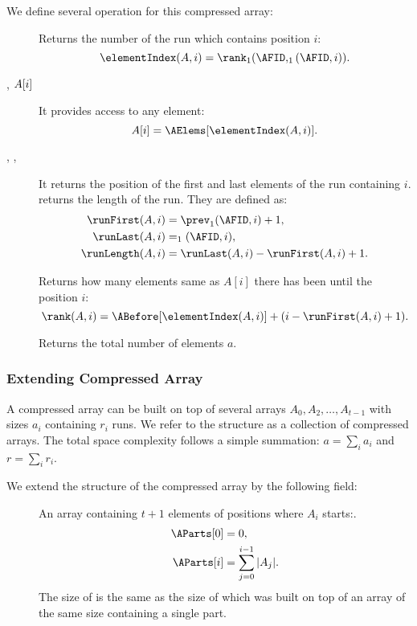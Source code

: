 We define several operation for this compressed array:
\begin{description}
	\item[\elementIndex{}]
	Returns the number of the run which contains position $i$:
	$$ \elementIndex(A, i) = \rank_1(\AFID, \succ_1(\AFID, i)). $$

	\item[\inspect{}, $A[i\char93$]
	It provides access to any element:
	$$ A[i] = \AElems[\elementIndex(A, i)]. $$

	\item[\runFirst{}, \runLast{}, \runLength{}]
	It returns the position of the first and last elements of the run containing $i$.
	\runLength{} returns the length of the run.
	They are defined as:
	\begin{align*}
		\runFirst(A, i) &= \prev_1(\AFID, i) + 1, \\
		\runLast(A, i) &= \succ_1(\AFID, i), \\
		\runLength(A, i) &= \runLast(A, i) - \runFirst(A, i) + 1.
	\end{align*}
	
	\item[\rank{}]
	Returns how many elements same as $A[i]$ there has been until the position $i$:
	$$ \rank(A, i) = \ABefore[\elementIndex(A, i)] + (i - \runFirst(A, i) + 1). $$
	
	\item[\size{}]
	Returns the total number of elements $a$.
\end{description}

\subsubsection{Extending Compressed Array}

A compressed array can be built on top of several arrays $A_0, A_2, \ldots, A_{t-1}$ with sizes $a_i$ containing $r_i$ runs.
We refer to the structure as a collection of compressed arrays.
The total space complexity follows a simple summation: $a = \sum_i a_i$ and $r = \sum_i r_i$.

We extend the structure of the compressed array by the following field:
\begin{description}
	\item[\AParts{}]
	An array containing $t + 1$ elements of positions where $A_i$ starts:.
	\begin{align*}
		\AParts[0] &= 0, \\
		\AParts[i] &= \sum_{j = 0}^{i - 1} |A_{j}|.
	\end{align*}
	The size of \AParts{} is the same as the size of \ABefore{} which was built on top of an array of the same size containing a single part.
\end{description}

